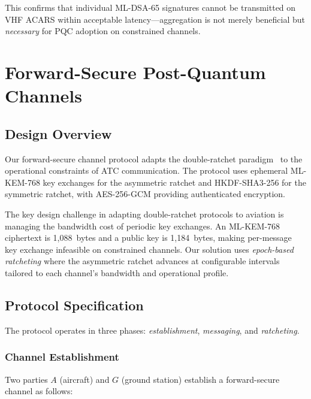 \documentclass[conference,10pt]{IEEEtran}
\begin{document}
This confirms that individual ML-DSA-65 signatures cannot be transmitted on VHF ACARS within acceptable latency---aggregation is not merely beneficial but \emph{necessary} for PQC adoption on constrained channels.

\section{Forward-Secure Post-Quantum Channels}
\label{sec:forward}

\subsection{Design Overview}

Our forward-secure channel protocol adapts the double-ratchet paradigm~\cite{cohn2020formal, alwen2020double} to the operational constraints of ATC communication. The protocol uses ephemeral ML-KEM-768 key exchanges for the asymmetric ratchet and HKDF-SHA3-256 for the symmetric ratchet, with AES-256-GCM providing authenticated encryption.

The key design challenge in adapting double-ratchet protocols to aviation is managing the bandwidth cost of periodic key exchanges. An ML-KEM-768 ciphertext is 1,088~bytes and a public key is 1,184~bytes, making per-message key exchange infeasible on constrained channels. Our solution uses \emph{epoch-based ratcheting} where the asymmetric ratchet advances at configurable intervals tailored to each channel's bandwidth and operational profile.

\subsection{Protocol Specification}

The protocol operates in three phases: \emph{establishment}, \emph{messaging}, and \emph{ratcheting}.

\subsubsection{Channel Establishment}

Two parties $A$ (aircraft) and $G$ (ground station) establish a forward-secure channel as follows:
\end{document}
